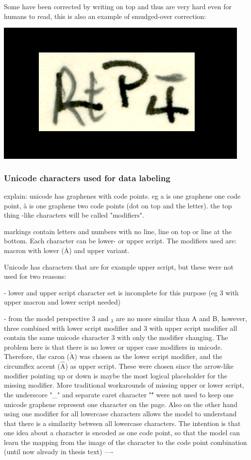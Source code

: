 \documentclass{article}
\begin{document}
Some have been corrected by writing on top and thus are very hard 
even for humans to read, this is also an example of smudged-over correction: 

\includegraphics*[scale=0.2]{../images/superambiguous_data_sample.png}

\subsubsection{Unicode characters used for data labeling}

explain: unicode has graphenes with code points. eg a is one graphene one code point,
à is one graphene two code points (dot on top and the letter). the top thing -like characters will be called 
"modifiers".

markings contain letters and numbers with no line, line on top or line at the bottom.
Each character can be lower- or upper script. The modifiers used are: 
macron with lower ($\bar{\mathrm{A}}$) and upper variant.

Unicode \cite{unicode_homepage} has characters that are for example upper script, but 
these were not used for two reasons:

- lower and upper script character set is incomplete for this purpose (eg 3 with upper macron and lower script needed)

- from the model perspective 3 and $_3$ are no more similar than A and B, however, 
three combined with lower script modifier and 3 with upper script modifier 
all contain the same unicode character 3 with only the modifier changing. The 
problem here is that there is no lower or upper case modifiers in unicode. Therefore,
the caron ($\check{\mathrm{A}}$) was chosen as the lower script modifier, and the circumflex accent ($\hat{\mathrm{A}}$)
as upper script. These were chosen since the arrow-like modifier pointing up or down
is maybe the most logical placeholder for the missing modifier. More traditional 
workarounds of missing upper or lower script, the underscore "\_" and separate 
caret character "\^ " were not used to keep one unicode graphene represent one character 
on the page. Also on the other hand using one modifier for all lowercase characters allows 
the model to understand that there is a similarity between all lowercase characters.
The intention is that one idea about a character is encoded as one code point, so that 
the model can learn the mapping from the image of the character to the code point 
combination
(until now already in thesis text)
----
\end{document}
